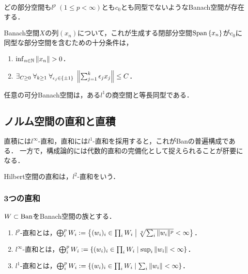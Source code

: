 \documentclass[uplatex,dvipdfmx]{jsreport}
\begin{document}
\begin{example}
    どの部分空間も$l^p\;(1\le p<\infty)$とも$c_0$とも同型でないようなBanach空間が存在する．
\end{example}

\begin{theorem}\label{thm-Bessaga-and-Pelczynski}
    Banach空間$X$の列$(x_n)$について，これが生成する閉部分空間$\mathrm{Span}\left\{x_n\right\}$が$c_0$に同型な部分空間を含むための十分条件は，
    \begin{enumerate}
        \item $\inf_{n\in\N}\norm{x_n}>0$．
        \item $\exists_{C\ge0}\;\forall_{k\ge1}\;\forall_{\epsilon_j\in\{\pm 1\}}\;\left\|\sum^k_{j=1}\epsilon_jx_j\right\|\le C$．
    \end{enumerate}
\end{theorem}

\begin{theorem}
    任意の可分Banach空間は，ある$l^1$の商空間と等長同型である．
\end{theorem}

\subsection{ノルム空間の直和と直積}

\begin{tcolorbox}[colframe=ForestGreen, colback=ForestGreen!10!white,breakable,colbacktitle=ForestGreen!40!white,coltitle=black,fonttitle=\bfseries\sffamily,
title=]
    直積には$l^\infty$-直和，直和には$l^1$-直和を採用すると，これがBanの普遍構成である．
    一方で，構成論的には代数的直和の完備化として捉えられることが肝要になる．

    Hilbert空間の直和は，$l^2$-直和をいう．
\end{tcolorbox}

\subsubsection{3つの直和}

\begin{definition}
    $W\subset\mathrm{Ban}$をBanach空間の族とする．
    \begin{enumerate}
        \item $l^p$-直和とは，$\bigoplus_{i}^pW_i:=\left\{(w_i)_i\in\prod_{i}W_i\;\middle|\;\sqrt[q]{\sum_i\|w_i\|^p}<\infty\right\}$．
        \item $l^\infty$-直和とは，$\bigoplus_{i}^pW_i:=\left\{(w_i)_i\in\prod_{i}W_i\;\middle|\;\sup_{i}\|w_i\|<\infty\right\}$．
        \item $l^1$-直和とは，$\bigoplus_{i}^pW_i:=\left\{(w_i)_i\in\prod_{i}W_i\;\middle|\;\sum_i\|w_i\|<\infty\right\}$．
    \end{enumerate}
\end{definition}
\end{document}
